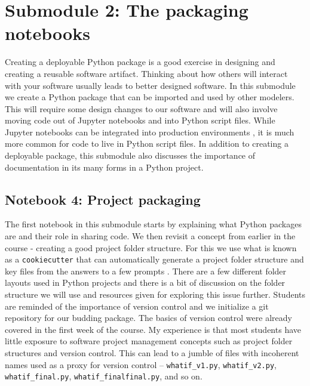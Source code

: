 \documentclass[ited,blindrev]{informs3}              %
\newcommand{\code}[1]{\texttt{#1}}
\begin{document}
\section{Submodule 2: The packaging notebooks}

Creating a deployable Python package is a good exercise in designing and creating a reusable software artifact. Thinking about how others will interact with your software usually leads to better designed software.  In this submodule we create a Python package that can be imported and used by other modelers. This will require some design changes to our software and will also involve moving code out of Jupyter notebooks and into Python script files. While Jupyter notebooks can be integrated into production environments \cite{netflix}, it is much more common for code to live in Python script files. In addition to creating a deployable package, this submodule also discusses the importance of documentation in its many forms in a Python project.


\subsection{Notebook 4: Project packaging}

The first notebook in this submodule starts by explaining what Python packages are and their role in sharing code. We then revisit a concept from earlier in the course - creating a good project folder structure. For this we use what is known as a \code{cookiecutter} that can automatically generate a project folder structure and key files from the answers to a few prompts \cite{cookiecutter}. There are a few different folder layouts used in Python projects and there is a bit of discussion on the folder structure we will use and resources given for exploring this issue further. Students are reminded of the importance of version control and we initialize a git repository for our budding package. The basics of version control were already covered in the first week of the course. My experience is that most students have little exposure to software project management concepts such as project folder structures and version control. This can lead to a jumble of files with incoherent names used as a proxy for version control -- \code{whatif\_v1.py}, \code{whatif\_v2.py}, \code{whatif\_final.py}, \code{whatif\_finalfinal.py}, and so on.
\end{document}
